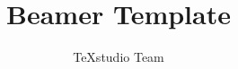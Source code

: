 


\title{Beamer Template}
\author{TeXstudio Team}


	
\begin{frame}[plain]
    \maketitle
\end{frame}




